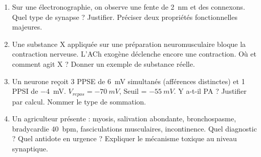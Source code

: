 \documentclass[11pt]{article}
\begin{document}
\begin{exercice}
\begin{enumerate}
\item Sur une électronographie, on observe une fente de \SI{2}{nm} et des connexons. Quel type de synapse ? Justifier. Préciser deux propriétés fonctionnelles majeures.
\item Une substance X appliquée sur une préparation neuromusculaire bloque la contraction nerveuse. L'ACh exogène déclenche encore une contraction. Où et comment agit X ? Donner un exemple de substance réelle.
\item Un neurone reçoit 3 PPSE de \SI{+6}{mV} simultanés (afférences distinctes) et 1 PPSI de \SI{-4}{mV}. $V_{repos} = \SI{-70}{mV}$, Seuil = $\SI{-55}{mV}$. Y a-t-il PA ? Justifier par calcul. Nommer le type de sommation.
\item Un agriculteur présente : myosis, salivation abondante, bronchospasme, bradycardie \SI{40}{bpm}, fasciculations musculaires, incontinence. Quel diagnostic ? Quel antidote en urgence ? Expliquer le mécanisme toxique au niveau synaptique.
\end{enumerate}
\end{exercice}
\end{document}
